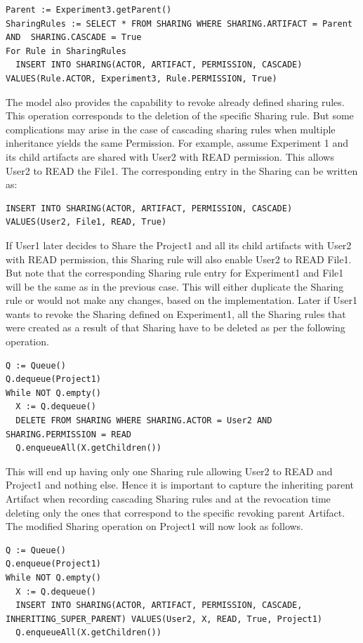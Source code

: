 \documentclass[sigconf]{acmart}
\begin{document}
\begin{lstlisting}
Parent := Experiment3.getParent()
SharingRules := SELECT * FROM SHARING WHERE SHARING.ARTIFACT = Parent AND  SHARING.CASCADE = True
For Rule in SharingRules
  INSERT INTO SHARING(ACTOR, ARTIFACT, PERMISSION, CASCADE) VALUES(Rule.ACTOR, Experiment3, Rule.PERMISSION, True)
\end{lstlisting}

The model also provides the capability to revoke already defined sharing rules. This operation corresponds to the deletion of the specific Sharing rule. But some complications may arise in the case of cascading sharing rules when multiple inheritance yields the same Permission. For example, assume Experiment 1 and its child artifacts are shared with User2 with READ permission. This allows User2 to READ the File1. The corresponding entry in the Sharing can be written as:

\begin{lstlisting}
INSERT INTO SHARING(ACTOR, ARTIFACT, PERMISSION, CASCADE) VALUES(User2, File1, READ, True)
\end{lstlisting}

If User1 later decides to Share the Project1 and all its child artifacts with User2 with READ permission, this Sharing rule will also enable User2 to READ File1. But note that the corresponding Sharing rule entry for Experiment1 and File1 will be the same as in the previous case. This will either duplicate the Sharing rule or would not make any changes, based on the implementation. Later if User1 wants to revoke the Sharing defined on Experiment1, all the Sharing rules that were created as a result of that Sharing have to be deleted as per the following operation.

\begin{lstlisting}
Q := Queue()
Q.dequeue(Project1)
While NOT Q.empty()
  X := Q.dequeue()
  DELETE FROM SHARING WHERE SHARING.ACTOR = User2 AND SHARING.PERMISSION = READ
  Q.enqueueAll(X.getChildren())
\end{lstlisting}

This will end up having only one Sharing rule allowing User2 to READ and Project1 and nothing else. Hence it is important to capture the inheriting parent Artifact when recording cascading Sharing rules and at the revocation time deleting only the ones that correspond to the specific revoking parent Artifact. The modified Sharing operation on Project1 will now look as follows.

\begin{lstlisting}
Q := Queue()
Q.enqueue(Project1)
While NOT Q.empty()
  X := Q.dequeue()
  INSERT INTO SHARING(ACTOR, ARTIFACT, PERMISSION, CASCADE, INHERITING_SUPER_PARENT) VALUES(User2, X, READ, True, Project1)
  Q.enqueueAll(X.getChildren())
\end{lstlisting}
\end{document}
